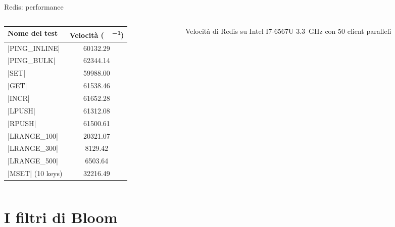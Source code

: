 \documentclass{beamer}
\begin{document}
	\begin{frame}[fragile]{Redis: performance}
	\begin{columns}[c]
		\begin{column}{7cm}
		\begin{table}
			\centering
			\begin{tabular}{lS[table-format=5.2,table-number-alignment=center]}
				\toprule
				 Nome del test & {Velocità (\SI{}{\req\per\sec})} \\
				\midrule
				\cverb|PING_INLINE| & 60132.29 \\
				\cverb|PING_BULK| & 62344.14 \\
				\midrule
				\cverb|SET| & 59988.00 \\
				\cverb|GET| & 61538.46 \\
				\cverb|INCR| & 61652.28 \\
				\cverb|LPUSH| & 61312.08 \\
				\cverb|RPUSH| & 61500.61 \\
				\midrule
				\cverb|LRANGE_100| & 20321.07 \\
				\cverb|LRANGE_300| & 8129.42 \\
				\cverb|LRANGE_500| & 6503.64 \\
				\midrule
				\cverb|MSET| (10 keys) & 32216.49 \\
				\bottomrule
			\end{tabular}
		\end{table}
		\end{column}
		\begin{column}{3cm}
		Velocità di Redis su Intel I7-6567U \SI{3.3}{\giga\hertz} con 50 client paralleli
		\end{column}
		\end{columns}
	\end{frame}









	\section{I filtri di Bloom}
\end{document}
